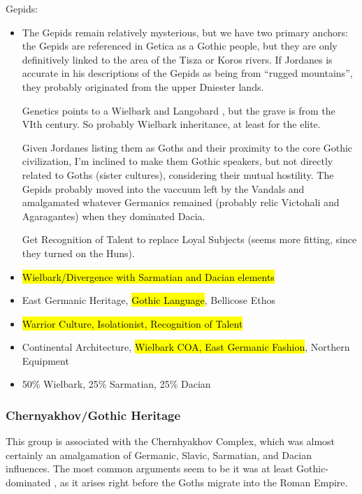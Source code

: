 \documentclass{article}
\begin{document}
	Gepids:
	\begin{itemize}
		\item The Gepids remain relatively mysterious, but we have two primary anchors:  the Gepids are referenced in Getica as a Gothic people, but they are only definitively linked to the area of the Tisza or Koros rivers. If Jordanes is accurate in his descriptions of the Gepids as being from “rugged mountains”, they probably originated from the upper Dniester lands.
		
		Genetics points to a Wielbark and Langobard \cite{GepidGenetics}, but the grave is from the VIth century. So probably Wielbark inheritance, at least for the elite.
		
		Given Jordanes listing them as Goths and their proximity to the core Gothic civilization, I’m inclined to make them Gothic speakers, but not directly related to Goths (sister cultures), considering their mutual hostility. The Gepids probably moved into the vaccuum left by the Vandals and amalgamated whatever Germanics remained (probably relic Victohali and Agaragantes) when they dominated Dacia.
		
		Get Recognition of Talent to replace Loyal Subjects (seems more fitting, since they turned on the Huns).
		\item \hl{Wielbark/Divergence with Sarmatian and Dacian elements}
		\item East Germanic Heritage, \hl{Gothic Language}, Bellicose Ethos
		\item \hl{Warrior Culture, Isolationist, Recognition of Talent}
		\item Continental Architecture, \hl{Wielbark COA, East Germanic Fashion}, Northern Equipment
		\item 50\% Wielbark, 25\% Sarmatian, 25\% Dacian
	\end{itemize}
	
	\subsubsection{Chernyakhov/Gothic Heritage}
	This group is associated with the Chernhyakhov Complex, which was almost certainly an amalgamation of Germanic, Slavic, Sarmatian, and Dacian influences.
	The most common arguments seem to be it was at least Gothic-dominated \cite{HeatherEmpiresAndBarbarians}, as it arises right before the Goths migrate into the Roman Empire.
	
\end{document}
